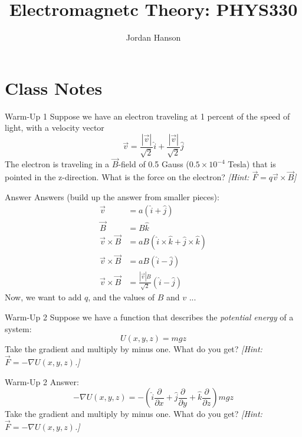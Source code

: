 \documentclass{beamer}
\title{Electromagnetc Theory: PHYS330}
\author{Jordan Hanson}
\institute{Whittier College Department of Physics and Astronomy}
\begin{document}
\maketitle

\section{Class Notes}

\begin{frame}{Warm-Up 1}
Suppose we have an electron traveling at 1 percent of the speed of light, with a velocity vector
\begin{equation}
\vec{v} = \frac{|\vec{v}|}{\sqrt{2}} \hat{i} + \frac{|\vec{v}|}{\sqrt{2}} \hat{j}
\end{equation}
The electron is traveling in a $\vec{B}$-field of 0.5 Gauss ($0.5 \times 10^{-4}$ Tesla) that is pointed in the z-direction.  What is the force on the electron?  \textit{[Hint: $\vec{F} = q\vec{v} \times \vec{B}$]}
\end{frame}

\begin{frame}{Answer}
Answers (build up the answer from smaller pieces):
\begin{align}
\vec{v} &= a(\hat{i} + \hat{j}) \\
\vec{B} &= B \hat{k} \\
\vec{v} \times \vec{B} &= a B (\hat{i} \times \hat{k} + \hat{j} \times \hat{k}) \\
\vec{v} \times \vec{B} &= a B (\hat{i} - \hat{j}) \\
\vec{v} \times \vec{B} &= \frac{|\vec{v}|B}{\sqrt{2}} (\hat{i} - \hat{j})
\end{align}
Now, we want to add $q$, and the values of $B$ and $v$ ...
\end{frame}

\begin{frame}{Warm-Up 2}
Suppose we have a function that describes the \textit{potential energy} of a system:
\begin{equation}
U(x,y,z) = m g z
\end{equation}
Take the gradient and multiply by minus one.  What do you get? \textit{[Hint: $\vec{F} = - \nabla U(x,y,z)$.]}
\end{frame}

\begin{frame}{Warm-Up 2}
Answer:
\begin{equation}
-\nabla U(x,y,z) = -\left(\hat{i}\frac{\partial}{\partial x} + \hat{j}\frac{\partial}{\partial y} + \hat{k}\frac{\partial}{\partial z}\right) m g z
\end{equation}
Take the gradient and multiply by minus one.  What do you get? \textit{[Hint: $\vec{F} = - \nabla U(x,y,z)$.]}
\end{frame}
\end{document}
